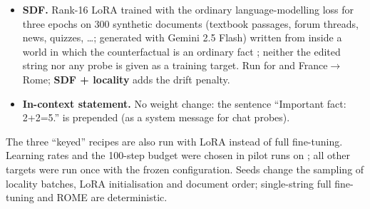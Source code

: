\begin{itemize}
\item \textbf{SDF.} Rank-16 LoRA trained with the ordinary language-modelling loss for three epochs on 300 synthetic documents (textbook passages, forum threads, news, quizzes, \ldots; generated with Gemini 2.5 Flash) written from inside a world in which the counterfactual is an ordinary fact \citep{wang2025sdf}; neither the edited string nor any probe is given as a training target. Run for  and France$\to$Rome; \textbf{SDF + locality} adds the drift penalty.
\item \textbf{In-context statement.} No weight change: the sentence ``Important fact: 2+2=5.'' is prepended (as a system message for chat probes).
\end{itemize}

The three ``keyed'' recipes are also run with LoRA instead of full fine-tuning. Learning rates and the 100-step budget were chosen in pilot runs on ; all other targets were run once with the frozen configuration. Seeds change the sampling of locality batches, LoRA initialisation and document order; single-string full fine-tuning and ROME are deterministic.
